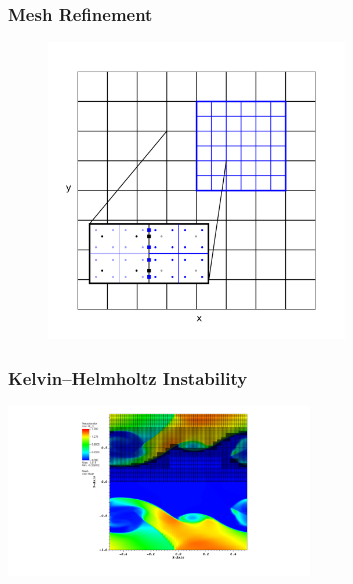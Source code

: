\documentclass{beamer}
\begin{document}
\begin{frame}
\frametitle{Mesh Refinement}

  \begin{figure}[htb!]
    \centering
    \includegraphics[width=0.7\textwidth]{fig.MeshRefinement_2D.png}
  \end{figure}

\end{frame}

\begin{frame}
\frametitle{Kelvin--Helmholtz Instability}

  \begin{center}
    {\includegraphics[width=0.6\textwidth]{fig.KHI.pdf}}
  \end{center}

\end{frame}
\end{document}
